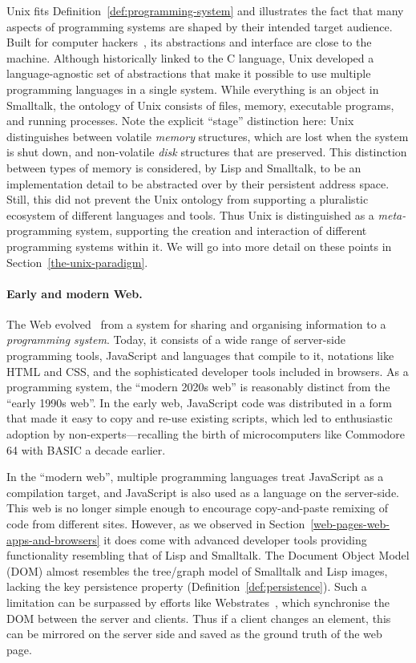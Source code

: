 Unix fits Definition~\ref{def:programming-system} and illustrates the
fact that many aspects of programming systems are shaped by their
intended target audience. Built for computer hackers~\cite{Hackers}, its
abstractions and interface are close to the machine. Although
historically linked to the C language, Unix developed a
language-agnostic set of abstractions that make it possible to use
multiple programming languages in a single system. While everything is
an object in Smalltalk, the ontology of Unix consists of files, memory,
executable programs, and running processes. Note the explicit ``stage''
distinction here: Unix distinguishes between volatile \emph{memory}
structures, which are lost when the system is shut down, and
non-volatile \emph{disk} structures that are preserved. This distinction
between types of memory is considered, by Lisp and Smalltalk, to be an
implementation detail to be abstracted over by their persistent address
space. Still, this did not prevent the Unix ontology from supporting a
pluralistic ecosystem of different languages and tools. Thus Unix is
distinguished as a \emph{meta-}programming system, supporting the
creation and interaction of different programming systems within it. We
will go into more detail on these points in
Section~\ref{the-unix-paradigm}.

\paragraph{Early and modern Web.}

The Web evolved~\cite{DotCom} from a system for sharing and organising
information to a \emph{programming system}. Today, it consists of a wide
range of server-side programming tools, JavaScript and languages that
compile to it, notations like HTML and CSS, and the sophisticated
developer tools included in browsers. As a programming system, the
``modern 2020s web'' is reasonably distinct from the ``early 1990s
web''. In the early web, JavaScript code was distributed in a form that
made it easy to copy and re-use existing scripts, which led to
enthusiastic adoption by non-experts---recalling the birth of
microcomputers like Commodore 64 with BASIC a decade earlier.

In the ``modern web'', multiple programming languages treat JavaScript
as a compilation target, and JavaScript is also used as a language on
the server-side. This web is no longer simple enough to encourage
copy-and-paste remixing of code from different sites. However, as we
observed in Section~\ref{web-pages-web-apps-and-browsers} it does come
with advanced developer tools providing functionality resembling that of
Lisp and Smalltalk. The Document Object Model (DOM) almost resembles the
tree/graph model of Smalltalk and Lisp images, lacking the key
persistence property (Definition~\ref{def:persistence}). Such a
limitation can be surpassed by efforts like
Webstrates~\cite{Webstrates}, which synchronise the DOM between the
server and clients. Thus if a client changes an element, this can be
mirrored on the server side and saved as the ground truth of the web
page.

